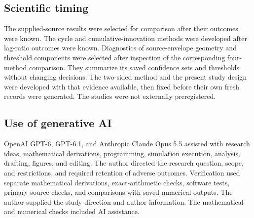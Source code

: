 \subsection{Scientific timing}
The supplied-source results were selected for comparison after their outcomes were known. The cycle and cumulative-innovation methods were developed after lag-ratio outcomes were known. Diagnostics of source-envelope geometry and threshold components were selected after inspection of the corresponding four-method comparison. They summarize its saved confidence sets and thresholds without changing decisions. The two-sided method and the present study design were developed with that evidence available, then fixed before their own fresh records were generated. The studies were not externally preregistered.

\subsection{Use of generative AI}
OpenAI GPT-6, GPT-6.1, and Anthropic Claude Opus 5.5 assisted with research ideas, mathematical derivations, programming, simulation execution, analysis, drafting, figures, and editing. The author directed the research question, scope, and restrictions, and required retention of adverse outcomes. Verification used separate mathematical derivations, exact-arithmetic checks, software tests, primary-source checks, and comparisons with saved numerical outputs. The author supplied the study direction and author information. The mathematical and numerical checks included AI assistance.
